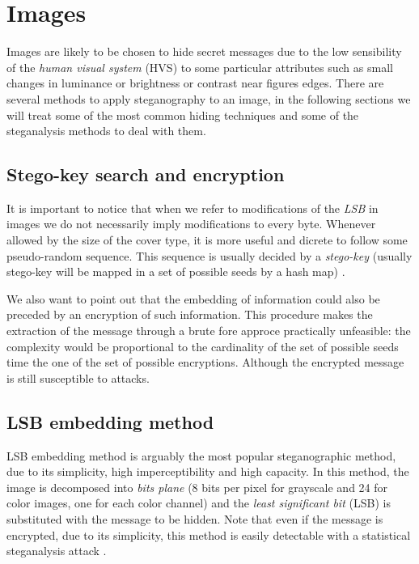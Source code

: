 \documentclass[../../main.tex]{subfiles}
\begin{document}
    
\section{Images}
Images are likely to be chosen to hide secret messages due to the low
sensibility of the \emph{human visual system} (HVS) to some particular
attributes such as small changes in luminance or brightness or contrast near
figures edges.
There are several methods to apply steganography to an image, in the
following sections we will treat some of the most common hiding techniques
and some of the steganalysis methods to deal with them.

\subsection{Stego-key search and encryption}

It is important to notice that when we refer to modifications of the \emph{LSB} in images we
do not necessarily imply modifications to every byte. Whenever allowed by the size of the cover type, it is 
more useful and dicrete to follow some pseudo-random sequence. This sequence is usually decided by a \emph{stego-key} (usually stego-key will be mapped in a set of possible
seeds by a hash map) \cite{stego-key}.

We also want to point out that the embedding of information could also be preceded by an encryption of such information.
This procedure makes the extraction of the message through a brute fore approce practically unfeasible: the complexity would
be proportional to the cardinality of the set of possible seeds time the
one of the set of possible encryptions. Although the encrypted message is still susceptible to attacks.

\subsection{LSB embedding method}
LSB embedding method is arguably the most popular steganographic method, due
to its simplicity, high imperceptibility and high capacity.
In this method, the image is decomposed into \emph{bits plane} (8 bits per
pixel for grayscale and 24 for color images, one for each color channel)
and the \emph{least significant bit} (LSB) is substituted with the message
to be hidden.
Note that even if the message is encrypted, due to its simplicity, this
method is easily detectable with a statistical steganalysis attack
\cite{techniques-data-hiding}.
\end{document}
